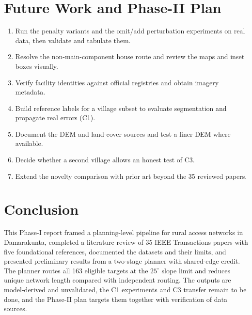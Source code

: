 \documentclass[12pt,a4paper]{report}
\begin{document}
\chapter{Future Work and Phase-II Plan}
\begin{enumerate}[nosep]
\item Run the penalty variants and the omit/add perturbation experiments on real data, then validate and tabulate them.
\item Resolve the non-main-component house route and review the maps and inset boxes visually.
\item Verify facility identities against official registries and obtain imagery metadata.
\item Build reference labels for a village subset to evaluate segmentation and propagate real errors (C1).
\item Document the DEM and land-cover sources and test a finer DEM where available.
\item Decide whether a second village allows an honest test of C3.
\item Extend the novelty comparison with prior art beyond the 35 reviewed papers.
\end{enumerate}

\chapter{Conclusion}
This Phase-I report framed a planning-level pipeline for rural access networks in Damarakunta, completed a literature review of 35 IEEE Transactions papers with five foundational references, documented the datasets and their limits, and presented preliminary results from a two-stage planner with shared-edge credit. The planner routes all 163 eligible targets at the $25^{\circ}$ slope limit and reduces unique network length compared with independent routing. The outputs are model-derived and unvalidated, the C1 experiments and C3 transfer remain to be done, and the Phase-II plan targets them together with verification of data sources.

\clearpage
{}
\renewcommand{\bibname}{References}


\end{document}
